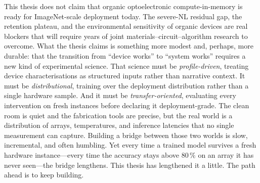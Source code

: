 This thesis does not claim that organic optoelectronic compute-in-memory is ready for ImageNet-scale deployment today.  The severe-NL residual gap, the retention plateau, and the environmental sensitivity of organic devices are real blockers that will require years of joint materials--circuit--algorithm research to overcome.  What the thesis claims is something more modest and, perhaps, more durable: that the transition from ``device works'' to ``system works'' requires a new kind of experimental science.  That science must be \emph{profile-driven}, treating device characterisations as structured inputs rather than narrative context.  It must be \emph{distributional}, training over the deployment distribution rather than a single hardware sample.  And it must be \emph{transfer-oriented}, evaluating every intervention on fresh instances before declaring it deployment-grade.  The clean room is quiet and the fabrication tools are precise, but the real world is a distribution of arrays, temperatures, and inference latencies that no single measurement can capture.  Building a bridge between those two worlds is slow, incremental, and often humbling.  Yet every time a trained model survives a fresh hardware instance---every time the accuracy stays above $80\,\%$ on an array it has never seen---the bridge lengthens.  This thesis has lengthened it a little.  The path ahead is to keep building.
